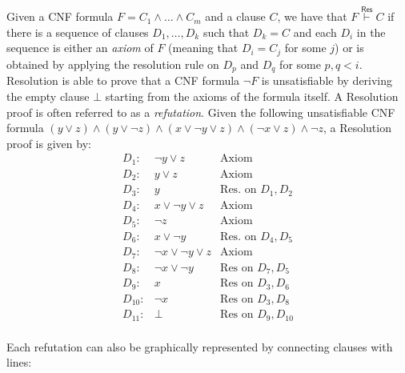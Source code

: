 Given a CNF formula $F = C_1 \land \ldots \land C_m$ and a clause $C$, we have that $F \stackrel{\mathsf{Res}}{\vdash} C$ if there is a sequence of clauses $D_1, \ldots, D_k$ such that $D_k = C$ and each $D_i$ in the sequence is either an \textit{axiom} of $F$ (meaning that $D_i = C_j$ for some $j$) or is obtained by applying the resolution rule on $D_p$ and $D_q$ for some $p,q < i$. Resolution is able to prove that a CNF formula $\lnot F$ is unsatisfiable by deriving the empty clause $\bot$ starting from the axioms of the formula itself. A Resolution proof is often referred to as a \textit{refutation}. Given the following unsatisfiable CNF formula $(y \lor z) \land (y \lor \lnot{z}) \land (x \lor \lnot{y} \lor z) \land (\lnot{x} \lor z) \land \lnot{z}$, a Resolution proof is given by:
\[\begin{array}{lcl}
 D_1 :& \lnot y \lor z & \text{Axiom} \\
 D_2 :& y \lor z & \text{Axiom} \\
 D_3 :& y & \text{Res. on $D_1, D_2$} \\
 D_4 :& x \lor \lnot y \lor z & \text{Axiom} \\
 D_5 :& \lnot z & \text{Axiom} \\
 D_6 :& x \lor \lnot y & \text{Res. on $D_4, D_5$} \\
 D_7 :& \lnot x \lor \lnot y \lor z & \text{Axiom} \\
 D_8 :& \lnot x \lor \lnot y & \text{Res on $D_7, D_5$} \\
 D_9 :& x & \text{Res on $D_3, D_6$} \\
 D_{10} :& \lnot x & \text{Res on $D_3, D_8$} \\
 D_{11} :& \bot & \text{Res on $D_9, D_{10}$} \\
\end{array}\]

\noindent
Each refutation can also be graphically represented by connecting clauses with lines:

